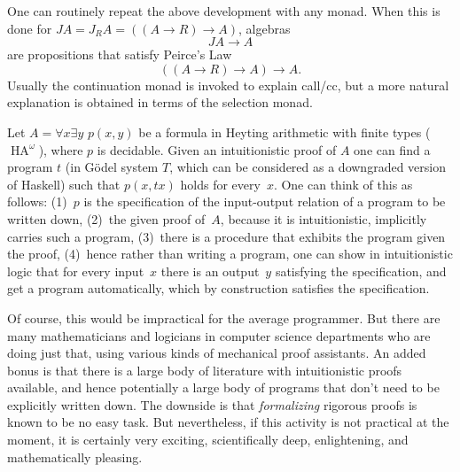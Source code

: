 

One can routinely repeat the above development with any monad. When
this is done for $J A = J_R A = ((A \to R) \to A)$, algebras 
\[
J A \to A
\]
are propositions that satisfy Peirce's Law \[ ((A \to R) \to A) \to
A.\] Usually the continuation monad is invoked to explain call/cc, but
a more natural explanation is obtained in terms of the selection monad. 




\newcommand{\HA}{\operatorname{HA}}
\newcommand{\PA}{\operatorname{PA}}

Let $A = \forall x \exists y \,\, p(x,y)$ be a formula in Heyting
arithmetic with finite types ($\HA^\omega$), where $p$ is decidable.
Given an intuitionistic proof of $A$ one can find a program $t$ (in
G\"odel system $T$, which can be considered as a downgraded version of
Haskell) such that $p(x,t x)$ holds for every~$x$. One can think of
this as follows: (1)~$p$ is the specification of the input-output
relation of a program to be written down, (2)~the given proof of~$A$,
because it is intuitionistic, implicitly carries such a program,
(3)~there is a procedure that exhibits the program given the proof,
(4)~hence rather than writing a program, one can show in
intuitionistic logic that for every input~$x$ there is an output~$y$
satisfying the specification, and get a program automatically, which
by construction satisfies the specification.

Of course, this would be impractical for the average programmer. But
there are many mathematicians and logicians in computer science
departments who are doing just that, using various kinds of mechanical
proof assistants. An added bonus is that there is a large body of
literature with intuitionistic proofs available, and hence potentially
a large body of programs that don't need to be explicitly written
down. The downside is that \emph{formalizing} rigorous proofs is known
to be no easy task. But nevertheless, if this activity is not
practical at the moment, it is certainly very exciting, scientifically
deep, enlightening, and mathematically pleasing.

